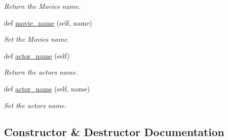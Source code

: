 \begin{DoxyCompactItemize}
\begin{DoxyCompactList}\small\item\em Return the Movie\textquotesingle{}s name. \end{DoxyCompactList}\item 
def \hyperlink{classbridges_1_1data__src__dependent_1_1movie__actor__wiki__data_1_1_moviegctor_wiki_data_a688ff47742e0f200cacea5ebcc170acb}{movie\+\_\+name} (self, name)
\begin{DoxyCompactList}\small\item\em Set the Movie\textquotesingle{}s name. \end{DoxyCompactList}\item 
def \hyperlink{classbridges_1_1data__src__dependent_1_1movie__actor__wiki__data_1_1_moviegctor_wiki_data_a4d85a52fcfcf17b88944bde1800a35f9}{actor\+\_\+name} (self)
\begin{DoxyCompactList}\small\item\em Return the actor\textquotesingle{}s name. \end{DoxyCompactList}\item 
def \hyperlink{classbridges_1_1data__src__dependent_1_1movie__actor__wiki__data_1_1_moviegctor_wiki_data_ab1792df62ff091a9e2ae2b8b80e1595d}{actor\+\_\+name} (self, name)
\begin{DoxyCompactList}\small\item\em Set the actor\textquotesingle{}s name. \end{DoxyCompactList}\end{DoxyCompactItemize}


\subsection{Constructor \& Destructor Documentation}
\mbox{\label{classbridges_1_1data__src__dependent_1_1movie__actor__wiki__data_1_1_moviegctor_wiki_data_a20d18c13877ee818bbd69b708c756683}} 
